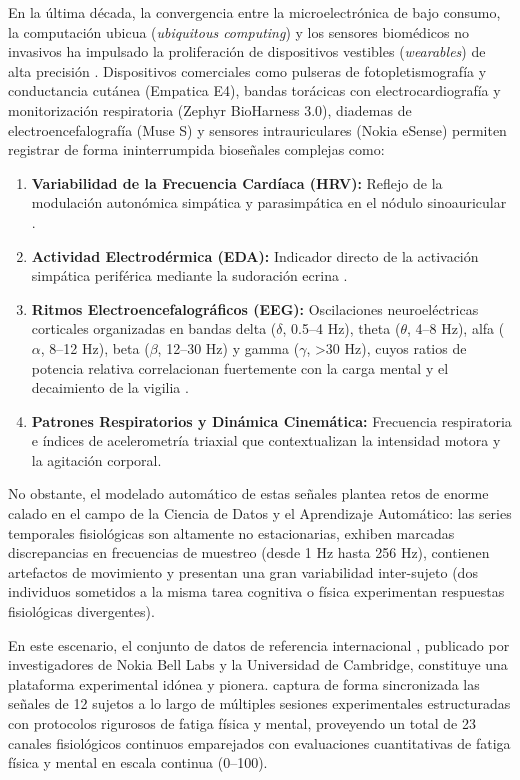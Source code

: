 En la última década, la convergencia entre la microelectrónica de bajo consumo, la computación ubicua (\textit{ubiquitous computing}) y los sensores biomédicos no invasivos ha impulsado la proliferación de dispositivos vestibles (\textit{wearables}) de alta precisión \cite{kalanadhabhatta2022fatigueset}. Dispositivos comerciales como pulseras de fotopletismografía y conductancia cutánea (Empatica E4), bandas torácicas con electrocardiografía y monitorización respiratoria (Zephyr BioHarness 3.0), diademas de electroencefalografía (Muse S) y sensores intrauriculares (Nokia eSense) permiten registrar de forma ininterrumpida bioseñales complejas como:
\begin{enumerate}
    \item \textbf{Variabilidad de la Frecuencia Cardíaca (HRV):} Reflejo de la modulación autonómica simpática y parasimpática en el nódulo sinoauricular \cite{taskforce1996heart}.
    \item \textbf{Actividad Electrodérmica (EDA):} Indicador directo de la activación simpática periférica mediante la sudoración ecrina \cite{boucsein2012electrodermal}.
    \item \textbf{Ritmos Electroencefalográficos (EEG):} Oscilaciones neuroeléctricas corticales organizadas en bandas delta ($\delta$, 0.5--4 Hz), theta ($\theta$, 4--8 Hz), alfa ($\alpha$, 8--12 Hz), beta ($\beta$, 12--30 Hz) y gamma ($\gamma$, >30 Hz), cuyos ratios de potencia relativa correlacionan fuertemente con la carga mental y el decaimiento de la vigilia \cite{klimesch1999eeg}.
    \item \textbf{Patrones Respiratorios y Dinámica Cinemática:} Frecuencia respiratoria e índices de acelerometría triaxial que contextualizan la intensidad motora y la agitación corporal.
\end{enumerate}

No obstante, el modelado automático de estas señales plantea retos de enorme calado en el campo de la Ciencia de Datos y el Aprendizaje Automático: las series temporales fisiológicas son altamente no estacionarias, exhiben marcadas discrepancias en frecuencias de muestreo (desde 1 Hz hasta 256 Hz), contienen artefactos de movimiento y presentan una gran variabilidad inter-sujeto (dos individuos sometidos a la misma tarea cognitiva o física experimentan respuestas fisiológicas divergentes).

En este escenario, el conjunto de datos de referencia internacional \fatigueset{} \cite{kalanadhabhatta2021fatigueset}, publicado por investigadores de Nokia Bell Labs y la Universidad de Cambridge, constituye una plataforma experimental idónea y pionera. \fatigueset{} captura de forma sincronizada las señales de 12 sujetos a lo largo de múltiples sesiones experimentales estructuradas con protocolos rigurosos de fatiga física y mental, proveyendo un total de 23 canales fisiológicos continuos emparejados con evaluaciones cuantitativas de fatiga física y mental en escala continua (0--100).


